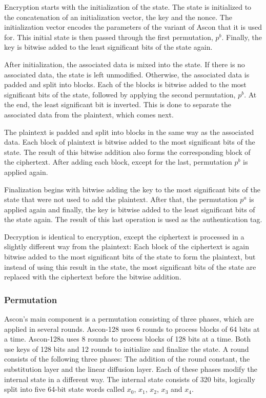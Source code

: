 

Encryption starts with the initialization of the state. The state is initialized
to the concatenation of an initialization vector, the key and the nonce. The
initialization vector encodes the parameters of the variant of Ascon that it is
used for. This initial state is then passed through the first permutation,
$p^b$. Finally, the key is bitwise added to the least significant bits of the
state again.

After initialization, the associated data is mixed into the state. If there is
no associated data, the state is left unmodified. Otherwise, the associated data
is padded and split into blocks. Each of the blocks is bitwise added to the most
significant bits of the state, followed by applying the second permutation,
$p^b$. At the end, the least significant bit is inverted. This is done to
separate the associated data from the plaintext, which comes next.

The plaintext is padded and split into blocks in the same way as the associated
data. Each block of plaintext is bitwise added to the most significant bits of
the state. The result of this bitwise addition also forms the corresponding
block of the ciphertext. After adding each block, except for the last,
permutation $p^b$ is applied again.

Finalization begins with bitwise adding the key to the most significant bits of
the state that were not used to add the plaintext. After that, the permutation
$p^a$ is applied again and finally, the key is bitwise added to the least
significant bits of the state again. The result of this last operation is used
as the authentication tag.

Decryption is identical to encryption, except the ciphertext is processed in a
slightly different way from the plaintext: Each block of the ciphertext is again
bitwise added to the most significant bits of the state to form the plaintext,
but instead of using this result in the state, the most significant bits of the
state are replaced with the ciphertext before the bitwise addition.

\subsubsection{Permutation}

Ascon's main component is a permutation consisting of three phases, which are
applied in several rounds. Ascon-128 uses 6 rounds to process blocks of 64 bits
at a time. Ascon-128a uses 8 rounds to process blocks of 128 bits at a time.
Both use keys of 128 bits and 12 rounds to initialize and finalize the state. A
round consists of the following three phases: The addition of the round
constant, the substitution layer and the linear diffusion layer. Each of these
phases modify the internal state in a different way. The internal state consists
of 320 bits, logically split into five 64-bit state words called $x_0$, $x_1$,
$x_2$, $x_3$ and $x_4$.

